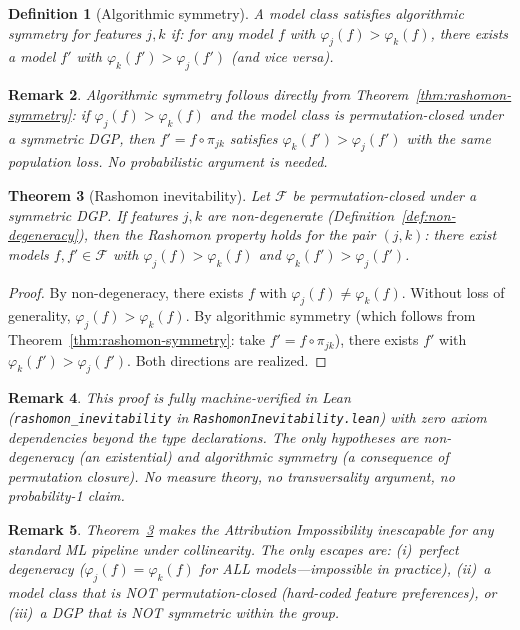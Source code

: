 \documentclass{article}
\newtheorem{theorem}{Theorem}
\newtheorem{definition}[theorem]{Definition}
\newtheorem{remark}[theorem]{Remark}
\begin{document}
\begin{definition}[Algorithmic symmetry]
\label{def:algo-sym}
A model class satisfies \emph{algorithmic symmetry} for features $j, k$ if: for any model $f$ with $\varphi_j(f) > \varphi_k(f)$, there exists a model $f'$ with $\varphi_k(f') > \varphi_j(f')$ (and vice versa).
\end{definition}

\begin{remark}
Algorithmic symmetry follows directly from Theorem~\ref{thm:rashomon-symmetry}: if $\varphi_j(f) > \varphi_k(f)$ and the model class is permutation-closed under a symmetric DGP, then $f' = f \circ \pi_{jk}$ satisfies $\varphi_k(f') > \varphi_j(f')$ with the same population loss. No probabilistic argument is needed.
\end{remark}

\begin{theorem}[Rashomon inevitability]
\label{thm:rashomon-inevitability}
Let $\mathcal{F}$ be permutation-closed under a symmetric DGP. If features $j, k$ are non-degenerate (Definition~\ref{def:non-degeneracy}), then the Rashomon property holds for the pair $(j, k)$: there exist models $f, f' \in \mathcal{F}$ with $\varphi_j(f) > \varphi_k(f)$ and $\varphi_k(f') > \varphi_j(f')$.
\end{theorem}

\begin{proof}
By non-degeneracy, there exists $f$ with $\varphi_j(f) \neq \varphi_k(f)$. Without loss of generality, $\varphi_j(f) > \varphi_k(f)$. By algorithmic symmetry (which follows from Theorem~\ref{thm:rashomon-symmetry}: take $f' = f \circ \pi_{jk}$), there exists $f'$ with $\varphi_k(f') > \varphi_j(f')$. Both directions are realized.
\end{proof}

\begin{remark}
This proof is fully machine-verified in Lean (\texttt{rashomon\_inevitability} in \texttt{RashomonInevitability.lean}) with zero axiom dependencies beyond the type declarations. The only hypotheses are non-degeneracy (an existential) and algorithmic symmetry (a consequence of permutation closure). No measure theory, no transversality argument, no probability-1 claim.
\end{remark}

\begin{remark}
Theorem~\ref{thm:rashomon-inevitability} makes the Attribution Impossibility inescapable for any standard ML pipeline under collinearity. The only escapes are: (i)~perfect degeneracy ($\varphi_j(f) = \varphi_k(f)$ for ALL models---impossible in practice), (ii)~a model class that is NOT permutation-closed (hard-coded feature preferences), or (iii)~a DGP that is NOT symmetric within the group.
\end{remark}
\end{document}
